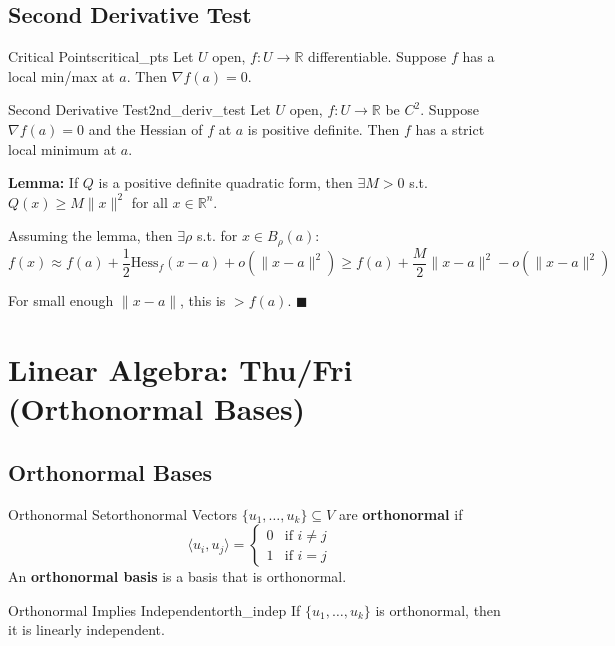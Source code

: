 \documentclass[11pt, letterpaper, openany]{book}
\renewenvironment{proof}[1][\proofname]{%
  \tcolorbox[blanker, breakable, left=1em,
    before skip=1em, after skip=1em,
    borderline west={2pt}{0pt}{MagicTeal!50},
    colback=MagicCream,
    before upper={\textcolor{MagicTeal}{\sffamily\bfseries #1.}\space}
  ]%
}{%
  \hfill\textcolor{MagicTeal}{\ensuremath{\blacksquare}}\endtcolorbox%
}
\begin{document}
\subsection{Second Derivative Test}

\begin{lem}{Critical Points}{critical_pts}
Let $U$ open, $f: U \to \mathbb{R}$ differentiable. Suppose $f$ has a local min/max at $a$. Then $\nabla f(a) = 0$.
\end{lem}

\begin{thm}{Second Derivative Test}{2nd_deriv_test}
Let $U$ open, $f: U \to \mathbb{R}$ be $C^2$. Suppose $\nabla f(a) = 0$ and the Hessian of $f$ at $a$ is positive definite. Then $f$ has a strict local minimum at $a$.
\end{thm}

\begin{proof}[Sketch]
\textbf{Lemma:} If $Q$ is a positive definite quadratic form, then $\exists M > 0$ s.t. $Q(x) \geq M\|x\|^2$ for all $x \in \mathbb{R}^n$.

Assuming the lemma, then $\exists \rho$ s.t. for $x \in B_\rho(a)$:
\[f(x) \approx f(a) + \frac{1}{2} \text{Hess}_f(x-a) + o(\|x-a\|^2) \geq f(a) + \frac{M}{2}\|x-a\|^2 - o(\|x-a\|^2)\]

For small enough $\|x-a\|$, this is $> f(a)$.
\end{proof}

\section{Linear Algebra: Thu/Fri (Orthonormal Bases)}

\subsection{Orthonormal Bases}

\begin{defn}{Orthonormal Set}{orthonormal}
Vectors $\{u_1, \ldots, u_k\} \subseteq V$ are \textbf{orthonormal} if
\[\langle u_i, u_j \rangle = \begin{cases} 0 & \text{if } i \neq j \\ 1 & \text{if } i = j \end{cases}\]
An \textbf{orthonormal basis} is a basis that is orthonormal.
\end{defn}

\begin{lem}{Orthonormal Implies Independent}{orth_indep}
If $\{u_1, \ldots, u_k\}$ is orthonormal, then it is linearly independent.
\end{lem}
\end{document}
